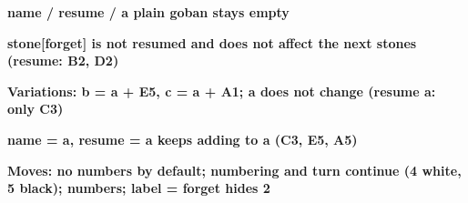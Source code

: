 \documentclass{article}
\newcommand\case[1]{\par\medskip\noindent\textbf{#1}\par\nopagebreak}
\begin{document}
\case{name / resume / a plain goban stays empty}
\begin{goban}[5, name = a]\end{goban}
\begin{goban}[5, resume = a]\end{goban}
\begin{goban}[5]\end{goban}

\case{stone[forget] is not resumed and does not affect the next stones (resume: B2, D2)}
\begin{goban}[5, name = a]\end{goban}
\begin{goban}[5, resume = a]\end{goban}

\case{Variations: b = a + E5, c = a + A1; a does not change (resume a: only C3)}
\begin{goban}[5, name = a]\end{goban}
\begin{goban}[5, name = b, resume = a]\end{goban}
\begin{goban}[5, resume = a, name = c]\end{goban}
\begin{goban}[5, resume = a]\end{goban}
\begin{goban}[5, resume = b]\end{goban}

\case{name = a, resume = a keeps adding to a (C3, E5, A5)}
\begin{goban}[5, name = a]\end{goban}
\begin{goban}[5, name = a, resume = a]\end{goban}
\begin{goban}[5, resume = a, name = a]\end{goban}
\begin{goban}[5, resume = a]\end{goban}

\case{Moves: no numbers by default; numbering and turn continue (4 white, 5 black); numbers; label = forget hides 2}
\begin{goban}[5, name = a]\end{goban}
\begin{goban}[5, resume = a]\end{goban}
\begin{goban}[5, resume = {a, numbers}]\end{goban}
\end{document}
